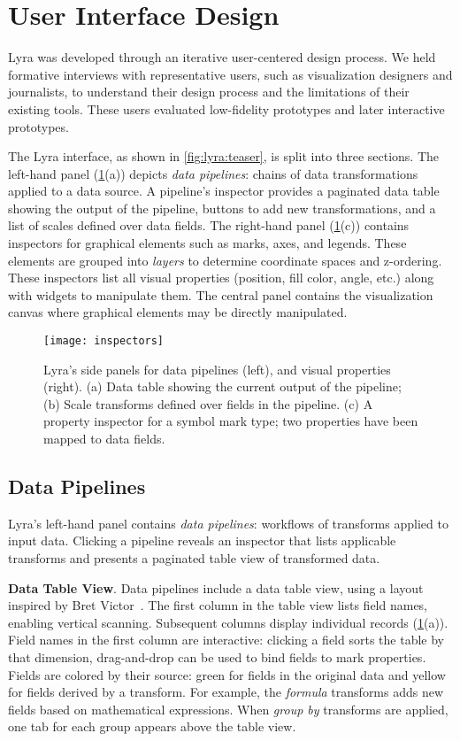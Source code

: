 \section{User Interface Design}

Lyra was developed through an iterative user-centered design process. We held
formative interviews with representative users, such as visualization designers
and journalists, to understand their design process and the limitations of their
existing tools. These users evaluated low-fidelity prototypes and later
interactive prototypes.

The Lyra interface, as shown in \cref{fig:lyra:teaser}, is split into three
sections. The left-hand panel (\cref{fig:lyra:inspectors}(a)) depicts \emph{data
pipelines}: chains of data transformations applied to a data source. A
pipeline's inspector provides a paginated data table showing the output of the
pipeline, buttons to add new transformations, and a list of scales defined over
data fields. The right-hand panel (\cref{fig:lyra:inspectors}(c)) contains
inspectors for graphical elements such as marks, axes, and legends. These
elements are grouped into \emph{layers} to determine coordinate spaces and
z-ordering. These inspectors list all visual properties (position, fill color,
angle, etc.) along with widgets to manipulate them. The central panel contains
the visualization canvas where graphical elements may be directly manipulated.

\begin{figure}[t!]
\texttt{[image: inspectors]}
\caption{Lyra's side panels for data pipelines (left), and
visual properties (right). (a) Data table showing the current output
of the pipeline; (b) Scale transforms defined over fields in the pipeline.
(c) A property inspector for a symbol mark type; two properties have been
mapped to data fields.}
\label{fig:lyra:inspectors}
\end{figure}

\subsection{Data Pipelines}

Lyra's left-hand panel contains \emph{data pipelines}: workflows of transforms
applied to input data. Clicking a pipeline reveals an inspector that lists
applicable transforms and presents a paginated table view of transformed data.

\textbf{Data Table View}. Data pipelines include a data table view, using a
layout inspired by Bret Victor~\cite{victor:drawing}. The first column in the
table view lists field names, enabling vertical scanning. Subsequent columns
display individual records (\cref{fig:lyra:inspectors}(a)). Field names in the
first column are interactive: clicking a field sorts the table by that
dimension, drag-and-drop can be used to bind fields to mark properties. Fields
are colored by their source: green for fields in the original data and yellow
for fields derived by a transform. For example, the \emph{formula} transforms
adds new fields based on mathematical expressions. When \emph{group by}
transforms are applied, one tab for each group appears above the table view.

